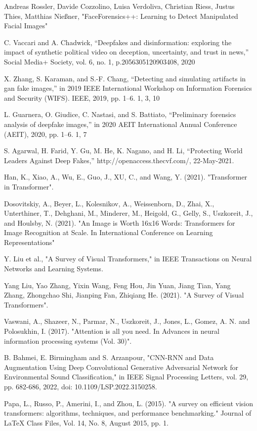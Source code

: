 \begin{thebibliography}{99}

     Andreas Rossler, Davide Cozzolino, Luisa Verdoliva, Christian Riess, Justus Thies, Matthias Nießner, "FaceForensics++: Learning to Detect Manipulated Facial Images"

     C. Vaccari and A. Chadwick, “Deepfakes and disinformation: exploring the impact of synthetic political video on deception, uncertainty, and trust in news,” Social Media+ Society, vol. 6, no. 1, p.2056305120903408, 2020
    
     X. Zhang, S. Karaman, and S.-F. Chang, “Detecting and simulating artifacts in gan fake images,” in 2019 IEEE International Workshop on Information Forensics and Security (WIFS). IEEE, 2019, pp. 1–6. 1, 3, 10
    
      L. Guarnera, O. Giudice, C. Nastasi, and S. Battiato, “Preliminary forensics analysis of deepfake images,” in 2020 AEIT International Annual Conference (AEIT), 2020, pp. 1–6. 1, 7

     S. Agarwal, H. Farid, Y. Gu, M. He, K. Nagano, and H. Li, “Protecting World 
    Leaders Against Deep Fakes,” http://openaccess.thecvf.com/,  22-May-2021.
       
     Han, K., Xiao, A., Wu, E., Guo, J., XU, C., and Wang, Y. (2021). "Transformer in Transformer".
    
     Dosovitskiy, A., Beyer, L., Kolesnikov, A., Weissenborn, D., Zhai, X., Unterthiner, T., Dehghani, M., Minderer, M., Heigold, G., Gelly, S., Uszkoreit, J., and Houlsby, N. (2021). "An Image is Worth 16x16 Words: Transformers for Image Recognition at Scale. In International Conference on Learning Representations"

     Y. Liu et al., "A Survey of Visual Transformers," in IEEE Transactions on Neural Networks and Learning Systems.

     Yang Liu, Yao Zhang, Yixin Wang, Feng Hou, Jin Yuan,
    Jiang Tian, Yang Zhang, Zhongchao Shi, Jianping Fan, Zhiqiang He. (2021). "A Survey of Visual Transformers".

     Vaswani, A., Shazeer, N., Parmar, N., Uszkoreit, J., Jones, L., Gomez, A. N. and Polosukhin, I. (2017). "Attention is all you need. In Advances in neural information processing systems (Vol. 30)".

     B. Bahmei, E. Birmingham and S. Arzanpour, "CNN-RNN and Data Augmentation Using Deep Convolutional Generative Adversarial Network for Environmental Sound Classification," in IEEE Signal Processing Letters, vol. 29, pp. 682-686, 2022, doi: 10.1109/LSP.2022.3150258.

     Papa, L., Russo, P., Amerini, I., and Zhou, L. (2015). "A survey on efficient vision transformers: algorithms, techniques, and performance benchmarking." Journal of LaTeX Class Files, Vol. 14, No. 8, August 2015, pp. 1.

\end{thebibliography}

